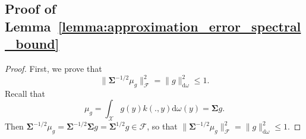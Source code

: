 \documentclass[twoside,11pt]{book}
\numberwithin{theorem}{chapter}
\numberwithin{definition}{chapter}
\numberwithin{proposition}{chapter}
\numberwithin{corollary}{chapter}
\numberwithin{example}{chapter}
\numberwithin{lemma}{chapter}
\numberwithin{assumption}{chapter}
\numberwithin{equation}{chapter}
\numberwithin{figure}{chapter}
\newcommand{\ab}[1]{\textcolor{red}{#1}}
\begin{document}
\subsection{Proof of Lemma~\ref{lemma:approximation_error_spectral_bound}}
\label{s:proofOfSeparationLemma}
\begin{proof}
First, we prove that
\begin{equation}
  \|\bm{\Sigma}^{-1/2}\mu_{g}\|_{\mathcal{F}}^{2} = \|g\|_{\mathrm{d}\omega}^{2} \leq 1.
\end{equation} 
 Recall that
\begin{equation}
\mu_{g} = \int_{\mathcal{X}} g(y)k(.,y) \mathrm{d}\omega(y) = \bm{\Sigma}g.
\end{equation}
Then $\bm{\Sigma}^{-1/2} \mu_{g} = \bm{\Sigma}^{-1/2} \bm{\Sigma} g = \bm{\Sigma}^{1/2} g \in \mathcal{F}$, so that $ \|\bm{\Sigma}^{-1/2}\mu_{g}\|_{\mathcal{F}}^{2} = \|g\|_{\mathrm{d}\omega}^{2} \leq 1$.

\end{proof}
\end{document}
